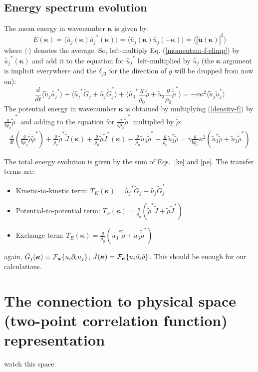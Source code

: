 \documentclass[12pt]{article}
\newcommand{\bk}{\bm{\kappa}}
\newcommand{\kp}{\kappa}
\begin{document}
\subsection{Energy spectrum evolution}
The mean energy in wavenumber $\bk$ is given by:
\begin{equation}
E(\bk) = \langle \tilde{{u}_j}(\bk) \tilde{{u}_j}^*(\bk) \rangle = \langle \tilde{{u}_j}(\bk) \tilde{{u}_j}(-\bk) \rangle= \langle |\tilde{\bm{u}}(\bk)|^2 \rangle
\end{equation}
where $\langle \cdot  \rangle$ denotes the average.
So, left-multiply Eq. (\ref{momentum-f-elimp}) by
$\tilde{u_j}^*(\bk)$ and add it to the equation for $\tilde{u_j}^*$
left-multiplied by $\tilde{u_j}$ (the $\bk$ argument is implicit everywhere and the $\delta_{j3}$ for the direction of $g$ will be dropped from now on):
\begin{equation}
\frac{d}{dt} \langle\tilde u_j \tilde{{u}_j}^*\rangle + 
\langle \tilde{u_j}^* \tilde G_j + \tilde{u_j} \tilde G_j^*\rangle+ \langle \tilde{u_3}^*\frac{g}{\rho_0}\tilde{\tilde \rho}  + \tilde u_3 \frac{g}{\rho_0}
\tilde{\tilde \rho}^*\rangle  = -\nu \kp^2 \langle\tilde u_j \tilde u_j^*\rangle
\label{ke}
\end{equation}
The potential energy in wavenumber $\bk$ is obtained by multiplying
(\ref{density-f}) by $\frac{g }{b \rho_0} \tilde{\tilde\rho}^*$ and adding to the equation for 
$\frac{g}{b \rho_0}\tilde{\tilde\rho}^*$ multiplied by $\tilde{\tilde\rho}$:
\begin{eqnarray}
\frac{d}{dt}( \frac{g }{b \rho_0} \tilde{\tilde \rho} \tilde{\tilde \rho}^*)  + 
\frac{g }{\rho_0} \tilde{\tilde \rho}^* \tilde J(\bm{\kappa}) + \frac{g}{\rho_0} \tilde{\tilde \rho} \tilde J^*(\bm{\kappa}) 
- \frac{g}{\rho_0} \tilde u_3 \tilde{\tilde \rho}^* - \frac{g }{\rho_0} \tilde u_3^* \tilde{\tilde \rho} = \gamma \frac{g }{b\rho_0} \kappa^2 (\tilde u_3^* \tilde {\tilde \rho} + \tilde u_3 \tilde {\tilde \rho}^*)
\label{pe}
\end{eqnarray}
 
The total energy evolution is given by the sum of Eqs.~\ref{ke} and \ref{pe}. The transfer terms are:
\begin{itemize}
\item Kinetic-to-kinetic term: $T_K(\bk)=\tilde{u_j}^* \tilde G_j + \tilde{u_j} \tilde G_j^*$

\item Potential-to-potential term: $T_P(\bk)=\frac{g }{\rho_0} (\tilde{\tilde \rho}^* \tilde J +  \tilde{\tilde \rho} \tilde J^*)$

\item Exchange term: $T_E(\bk)=\frac{g}{\rho_0}(\tilde{u_3}^*\tilde{\tilde \rho}  + \tilde u_3 \tilde{\tilde \rho}^*)$
\end{itemize}again, $\tilde G_j(\bk) = {\cal F}_{\bk}\{u_i \partial_i u_j\}$, $\tilde J(\bk) = {\cal F}_{\bm{\kappa}}\{u_i \partial_i \tilde\rho\}$.
This should be enough for our calculations.

\section{The connection to physical space (two-point correlation function) representation}

watch this space.
\end{document}
